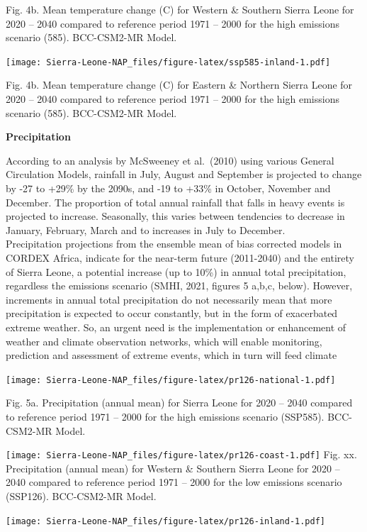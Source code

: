 \documentclass[
]{book}
\begin{document}
Fig. 4b. Mean temperature change (C) for Western \& Southern Sierra Leone for 2020 -- 2040 compared to reference period 1971 -- 2000 for the high emissions scenario (585). BCC-CSM2-MR Model.

\texttt{[image: Sierra-Leone-NAP\_files/figure-latex/ssp585-inland-1.pdf]}

Fig. 4b. Mean temperature change (C) for Eastern \& Northern Sierra Leone for 2020 -- 2040 compared to reference period 1971 -- 2000 for the high emissions scenario (585). BCC-CSM2-MR Model.

\textbf{Precipitation}

According to an analysis by McSweeney et al.~(2010) using various General Circulation Models, rainfall in July, August and September is projected to change by -27 to +29\% by the 2090s, and -19 to +33\% in October, November and December. The proportion of total annual rainfall that falls in heavy events is projected to increase. Seasonally, this varies between tendencies to decrease in January, February, March and to increases in July to December.\\
Precipitation projections from the ensemble mean of bias corrected models in CORDEX Africa, indicate for the near-term future (2011-2040) and the entirety of Sierra Leone, a potential increase (up to 10\%) in annual total precipitation, regardless the emissions scenario (SMHI, 2021, figures 5 a,b,c, below). However, increments in annual total precipitation do not necessarily mean that more precipitation is expected to occur constantly, but in the form of exacerbated extreme weather. So, an urgent need is the implementation or enhancement of weather and climate observation networks, which will enable monitoring, prediction and assessment of extreme events, which in turn will feed climate

\texttt{[image: Sierra-Leone-NAP\_files/figure-latex/pr126-national-1.pdf]}

Fig. 5a. Precipitation (annual mean) for Sierra Leone for 2020 -- 2040 compared to reference period 1971 -- 2000 for the high emissions scenario (SSP585). BCC-CSM2-MR Model.

\texttt{[image: Sierra-Leone-NAP\_files/figure-latex/pr126-coast-1.pdf]}
Fig. xx. Precipitation (annual mean) for Western \& Southern Sierra Leone for 2020 -- 2040 compared to reference period 1971 -- 2000 for the low emissions scenario (SSP126). BCC-CSM2-MR Model.

\texttt{[image: Sierra-Leone-NAP\_files/figure-latex/pr126-inland-1.pdf]}
\end{document}
